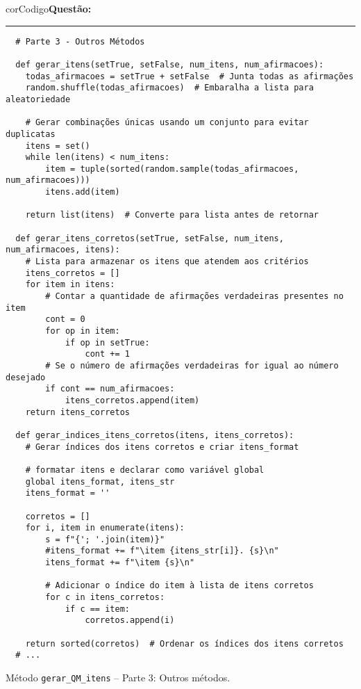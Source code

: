 \begin{listing}[!ht]
  \begin{myboxCode}{corCodigo}{\textbf{Questão: }}\vspace{3mm}
  \hrule
  \begin{verbatim}
  # Parte 3 - Outros Métodos 

  def gerar_itens(setTrue, setFalse, num_itens, num_afirmacoes):
    todas_afirmacoes = setTrue + setFalse  # Junta todas as afirmações
    random.shuffle(todas_afirmacoes)  # Embaralha a lista para aleatoriedade

    # Gerar combinações únicas usando um conjunto para evitar duplicatas
    itens = set()
    while len(itens) < num_itens:
        item = tuple(sorted(random.sample(todas_afirmacoes, num_afirmacoes)))
        itens.add(item)

    return list(itens)  # Converte para lista antes de retornar

  def gerar_itens_corretos(setTrue, setFalse, num_itens, num_afirmacoes, itens):
    # Lista para armazenar os itens que atendem aos critérios
    itens_corretos = []
    for item in itens:
        # Contar a quantidade de afirmações verdadeiras presentes no item
        cont = 0
        for op in item:
            if op in setTrue:
                cont += 1
        # Se o número de afirmações verdadeiras for igual ao número desejado
        if cont == num_afirmacoes:
            itens_corretos.append(item)
    return itens_corretos

  def gerar_indices_itens_corretos(itens, itens_corretos):
    # Gerar índices dos itens corretos e criar itens_format

    # formatar itens e declarar como variável global
    global itens_format, itens_str
    itens_format = ''

    corretos = []
    for i, item in enumerate(itens):
        s = f"{'; '.join(item)}"
        #itens_format += f"\item {itens_str[i]}. {s}\n"
        itens_format += f"\item {s}\n"

        # Adicionar o índice do item à lista de itens corretos
        for c in itens_corretos:
            if c == item:
                corretos.append(i)

    return sorted(corretos)  # Ordenar os índices dos itens corretos
  # ...
\end{verbatim}
\end{myboxCode}
\caption{Método \texttt{gerar\_QM\_itens} -- Parte 3: Outros métodos.}
\label{lst:questaoQM_gerar_QM_itens_parte3}
\end{listing}

